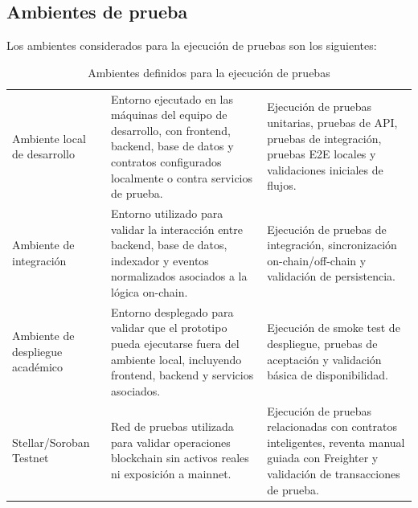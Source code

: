 \documentclass[12pt,letterpaper]{article}
\begin{document}
\subsection{Ambientes de prueba}

Los ambientes considerados para la ejecución de pruebas son los siguientes:

\begin{table}[H]
\centering

\begingroup
\scriptsize
\setlength{\tabcolsep}{3pt}
\renewcommand{\arraystretch}{1.22}

\begin{tabularx}{\textwidth}{|
>{\raggedright\arraybackslash}p{3.2cm}|
>{\raggedright\arraybackslash}X|
>{\raggedright\arraybackslash}p{4.8cm}|}
\hline
\multicolumn{1}{|>{\centering\arraybackslash}m{3.2cm}|}{\textbf{Ambiente}} &
\multicolumn{1}{>{\centering\arraybackslash}m{6.4cm}|}{\textbf{Descripción}} &
\multicolumn{1}{>{\centering\arraybackslash}m{4.8cm}|}{\textbf{Uso dentro del plan de pruebas}} \\
\hline

Ambiente local de desarrollo &
Entorno ejecutado en las máquinas del equipo de desarrollo, con frontend, backend, base de datos y contratos configurados localmente o contra servicios de prueba. &
Ejecución de pruebas unitarias, pruebas de API, pruebas de integración, pruebas E2E locales y validaciones iniciales de flujos. \\
\hline

Ambiente de integración &
Entorno utilizado para validar la interacción entre backend, base de datos, indexador y eventos normalizados asociados a la lógica on-chain. &
Ejecución de pruebas de integración, sincronización on-chain/off-chain y validación de persistencia. \\
\hline

Ambiente de despliegue académico &
Entorno desplegado para validar que el prototipo pueda ejecutarse fuera del ambiente local, incluyendo frontend, backend y servicios asociados. &
Ejecución de smoke test de despliegue, pruebas de aceptación y validación básica de disponibilidad. \\
\hline

Stellar/Soroban Testnet &
Red de pruebas utilizada para validar operaciones blockchain sin activos reales ni exposición a mainnet. &
Ejecución de pruebas relacionadas con contratos inteligentes, reventa manual guiada con Freighter y validación de transacciones de prueba. \\
\hline

\end{tabularx}

\endgroup

\caption{Ambientes definidos para la ejecución de pruebas}
\label{tab:ambientes-prueba}
\end{table}
\end{document}
